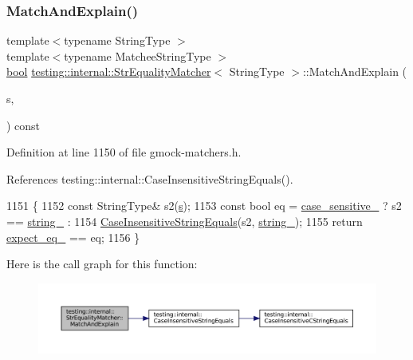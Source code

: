 \subsubsection{\texorpdfstring{Match\+And\+Explain()}{MatchAndExplain()}\hspace{0.1cm}{\footnotesize\ttfamily [2/2]}}
{\footnotesize\ttfamily template$<$typename String\+Type $>$ \\
template$<$typename Matchee\+String\+Type $>$ \\
\hyperlink{classbool}{bool} \hyperlink{classtesting_1_1internal_1_1StrEqualityMatcher}{testing\+::internal\+::\+Str\+Equality\+Matcher}$<$ String\+Type $>$\+::Match\+And\+Explain (\begin{DoxyParamCaption}\item[{const Matchee\+String\+Type \&}]{s,  }\item[{\hyperlink{classtesting_1_1MatchResultListener}{Match\+Result\+Listener} $\ast$}]{ }\end{DoxyParamCaption}) const\hspace{0.3cm}{\ttfamily [inline]}}



Definition at line 1150 of file gmock-\/matchers.\+h.



References testing\+::internal\+::\+Case\+Insensitive\+String\+Equals().


\begin{DoxyCode}
1151                                                      \{
1152     \textcolor{keyword}{const} StringType& s2(\hyperlink{namespaceservice__node__3_aa976421a49e0b54f23833423400849ae}{s});
1153     \textcolor{keyword}{const} \textcolor{keywordtype}{bool} eq = \hyperlink{classtesting_1_1internal_1_1StrEqualityMatcher_adabf80fed2710950dd44b2a08fa5930c}{case\_sensitive\_} ? s2 == \hyperlink{classtesting_1_1internal_1_1StrEqualityMatcher_af6967de4d57d461f3e7c98bece4d1f48}{string\_} :
1154         \hyperlink{namespacetesting_1_1internal_a383de24b1cca6648c14b03964c0ed843}{CaseInsensitiveStringEquals}(s2, \hyperlink{classtesting_1_1internal_1_1StrEqualityMatcher_af6967de4d57d461f3e7c98bece4d1f48}{string\_});
1155     \textcolor{keywordflow}{return} \hyperlink{classtesting_1_1internal_1_1StrEqualityMatcher_a95f7c07612ee34d8ebd1dc97c707901d}{expect\_eq\_} == eq;
1156   \}
\end{DoxyCode}
Here is the call graph for this function\+:
\nopagebreak
\begin{figure}[H]
\begin{center}
\leavevmode
\includegraphics[width=350pt]{classtesting_1_1internal_1_1StrEqualityMatcher_aedb1ac6fc8c15b318dfd8e99927aa2e1_cgraph}
\end{center}
\end{figure}


